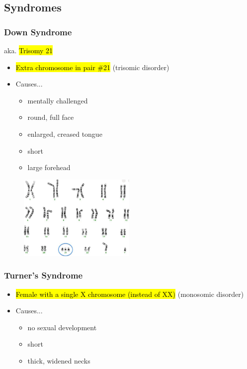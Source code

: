 \documentclass[a4paper,12pt]{article}
\begin{document}
\subsection{Syndromes}

\subsubsection{Down Syndrome}
aka. \hl{Trisomy 21}

\begin{itemize}
    \item{\hl{Extra chromosome in pair \#21} (trisomic disorder)}
    \item{
            Causes...
            \begin{itemize}
                \item{mentally challenged}
                \item{round, full face}
                \item{enlarged, creased tongue}
                \item{short}
                \item{large forehead}
            \end{itemize}
        }
\end{itemize}

\begin{figure}[H]
    \centering
    \includegraphics[width=0.50\textwidth]{down}
\end{figure}

\pagebreak

\subsubsection{Turner's Syndrome}
\begin{itemize}
    \item{\hl{Female with a single \female X chromosome (instead of \female XX)} (monosomic disorder)}
    \item{
            Causes...
            \begin{itemize}
                \item{no sexual development}
                \item{short}
                \item{thick, widened necks}
            \end{itemize}
        }
\end{itemize}
\end{document}
